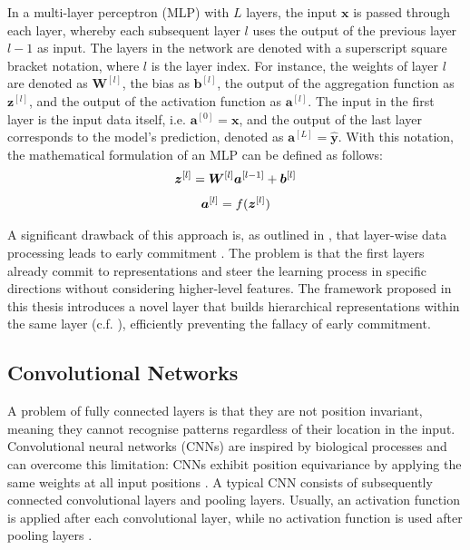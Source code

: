 In a multi-layer perceptron (MLP) with $L$ layers, the input \(\boldsymbol{x}\) is passed through each layer, whereby each subsequent layer \(l\) uses the output of the previous layer \(l-1\) as input.
The layers in the network are denoted with a superscript square bracket notation, where $l$ is the layer index. 
For instance, the weights of layer $l$ are denoted as $\boldsymbol{W}^{[l]}$, the bias as \(\boldsymbol{b}^{[l]}\), the output of the aggregation function as \(\boldsymbol{z}^{[l]}\), and the output of the activation function as \(\boldsymbol{a}^{[l]}\).
The input in the first layer is the input data itself, i.e. $\boldsymbol{a}^{[0]} = \boldsymbol{x}$, and the output of the last layer corresponds to the model's prediction, denoted as $\boldsymbol{a}^{[L]} = \hat{\boldsymbol{y}}$. With this notation, the mathematical formulation of an MLP can be defined as follows:
%
\begin{align}\eqlbl{mlp}
		\boldsymbol{z}^{[l]} = \boldsymbol{W}^{[l]}\boldsymbol{a}^{[l-1]} + \boldsymbol{b}^{[l]}
\end{align}
%
\begin{align}\eqlbl{mlp2}
		\boldsymbol{a}^{[l]} = f(\boldsymbol{z}^{[l]})
\end{align}

A significant drawback of this approach is, as outlined in , that layer-wise data processing leads to early commitment .
The problem is that the first layers already commit to representations and steer the learning process in specific directions without considering higher-level features.
The framework proposed in this thesis introduces a novel layer that builds hierarchical representations within the same layer (c.f. ), efficiently preventing the fallacy of early commitment.


\subsection{Convolutional Networks}
A problem of fully connected layers is that they are not position invariant, meaning they cannot recognise patterns regardless of their location in the input.
Convolutional neural networks (CNNs)  are inspired by biological processes  and can overcome this limitation: CNNs exhibit position equivariance by applying the same weights at all input positions \cite{gerber_stride_2020}.
A typical CNN consists of subsequently connected convolutional layers and pooling layers.
Usually, an activation function is applied after each convolutional layer, while no activation function is used after pooling layers \cite{goodfellow_deep_2016}.

